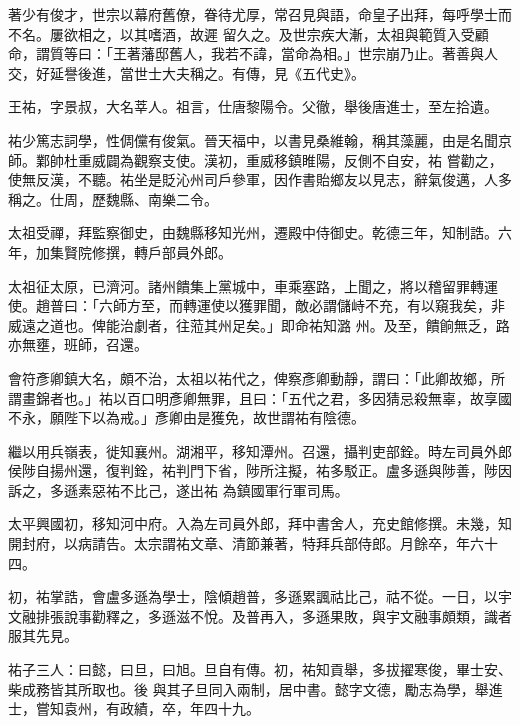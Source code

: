 \begin{pinyinscope}
 著少有俊才，世宗以幕府舊僚，眷待尤厚，常召見與語，命皇子出拜，每呼學士而不名。屢欲相之，以其嗜酒，故遲
 留久之。及世宗疾大漸，太祖與範質入受顧命，謂質等曰：「王著藩邸舊人，我若不諱，當命為相。」世宗崩乃止。著善與人交，好延譽後進，當世士大夫稱之。有傳，見《五代史》。



 王祐，字景叔，大名莘人。祖言，仕唐黎陽令。父徹，舉後唐進士，至左拾遺。



 祐少篤志詞學，性倜儻有俊氣。晉天福中，以書見桑維翰，稱其藻麗，由是名聞京師。鄴帥杜重威闢為觀察支使。漢初，重威移鎮睢陽，反側不自安，祐
 嘗勸之，使無反漢，不聽。祐坐是貶沁州司戶參軍，因作書貽鄉友以見志，辭氣俊邁，人多稱之。仕周，歷魏縣、南樂二令。



 太祖受禪，拜監察御史，由魏縣移知光州，遷殿中侍御史。乾德三年，知制誥。六年，加集賢院修撰，轉戶部員外郎。



 太祖征太原，已濟河。諸州饋集上黨城中，車乘塞路，上聞之，將以稽留罪轉運使。趙普曰：「六師方至，而轉運使以獲罪聞，敵必謂儲峙不充，有以窺我矣，非威遠之道也。俾能治劇者，往蒞其州足矣。」即命祐知潞
 州。及至，饋餉無乏，路亦無壅，班師，召還。



 會符彥卿鎮大名，頗不治，太祖以祐代之，俾察彥卿動靜，謂曰：「此卿故鄉，所謂畫錦者也。」祐以百口明彥卿無罪，且曰：「五代之君，多因猜忌殺無辜，故享國不永，願陛下以為戒。」彥卿由是獲免，故世謂祐有陰德。



 繼以用兵嶺表，徙知襄州。湖湘平，移知潭州。召還，攝判吏部銓。時左司員外郎侯陟自揚州還，復判銓，祐判門下省，陟所注擬，祐多駁正。盧多遜與陟善，陟因訴之，多遜素惡祐不比己，遂出祐
 為鎮國軍行軍司馬。



 太平興國初，移知河中府。入為左司員外郎，拜中書舍人，充史館修撰。未幾，知開封府，以病請告。太宗謂祐文章、清節兼著，特拜兵部侍郎。月餘卒，年六十四。



 初，祐掌誥，會盧多遜為學士，陰傾趙普，多遜累諷祜比己，祜不從。一日，以宇文融排張說事勸釋之，多遜滋不悅。及普再入，多遜果敗，與宇文融事頗類，識者服其先見。



 祐子三人：曰懿，曰旦，曰旭。旦自有傳。初，祐知貢舉，多拔擢寒俊，畢士安、柴成務皆其所取也。後
 與其子旦同入兩制，居中書。懿字文德，勵志為學，舉進士，嘗知袁州，有政績，卒，年四十九。




\end{pinyinscope}
